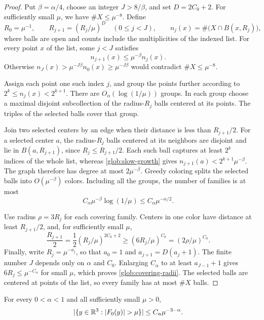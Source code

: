 \begin{proof}
Put $\beta=\alpha/4$, choose an integer $J>8/\beta$, and set
$D=2C_0+2$. For sufficiently small $\mu$, we have $\#X\le\mu^{-8}$.
Define
\[
 R_0=\mu^{-1},\qquad R_{j+1}=(R_j/\mu)^D
              \quad(0\le j<J),
 \qquad n_j(x)=\#\bigl(X\cap B(x,R_j)\bigr),
\]
where balls are open and counts include the multiplicities of the
indexed list. For every point $x$ of the list, some $j<J$ satisfies
\begin{equation}\label{glob:slow-growth}
                n_{j+1}(x)\le\mu^{-\beta}n_j(x).
\end{equation}
Otherwise $n_J(x)>\mu^{-J\beta}n_0(x)\ge\mu^{-J\beta}$ would
contradict $\#X\le\mu^{-8}$.

Assign each point one such index $j$, and group the points further
according to $2^k\le n_j(x)<2^{k+1}$. There are
$O_\alpha(\log(1/\mu))$ groups. In each group choose a maximal
disjoint subcollection of the radius-$R_j$ balls centered at its
points. The triples of the selected balls cover that group.

Join two selected centers by an edge when their distance is less than
$R_{j+1}/2$. For a selected center $a$, the radius-$R_j$ balls
centered at its neighbors are disjoint and lie in $B(a,R_{j+1})$,
since $R_j\le R_{j+1}/2$. Each such ball captures at least $2^k$
indices of the whole list, whereas \eqref{glob:slow-growth} gives
$n_{j+1}(a)<2^{k+1}\mu^{-\beta}$. The graph therefore has degree
at most $2\mu^{-\beta}$. Greedy coloring splits the selected balls
into $O(\mu^{-\beta})$ colors. Including all the groups, the number
of families is at most
\[
 C_\alpha\mu^{-\beta}\log(1/\mu)
                         \le C_\alpha\mu^{-\alpha/2}.
\]

Use radius $\rho=3R_j$ for each covering family. Centers in one
color have distance at least $R_{j+1}/2$, and, for sufficiently small
$\mu$,
\[
       \frac{R_{j+1}}2
       =\frac12(R_j/\mu)^{2C_0+2}
       \ge(6R_j/\mu)^{C_0}
       =(2\rho/\mu)^{C_0}.
\]
Finally, write $R_j=\mu^{-a_j}$, so that
$a_0=1$ and $a_{j+1}=D(a_j+1)$. The finite number $J$ depends only
on $\alpha$ and $C_0$. Enlarging $C_\alpha$ to at least
$a_{J-1}+1$ gives $6R_j\le\mu^{-C_\alpha}$ for small $\mu$,
which proves \eqref{glob:covering-radii}. The selected balls are
centered at points of the list, so every family has at most $\#X$
balls.
\end{proof}

\begin{proposition}\label{glob:distribution}
For every $0<\alpha<1$ and all sufficiently small $\mu>0$,
\begin{equation}\label{glob:distribution-bound}
       |\{y\in\R^3:|F_0(y)|>\mu\}|
                            \le C_\alpha\mu^{-3-\alpha}.
\end{equation}
\end{proposition}

